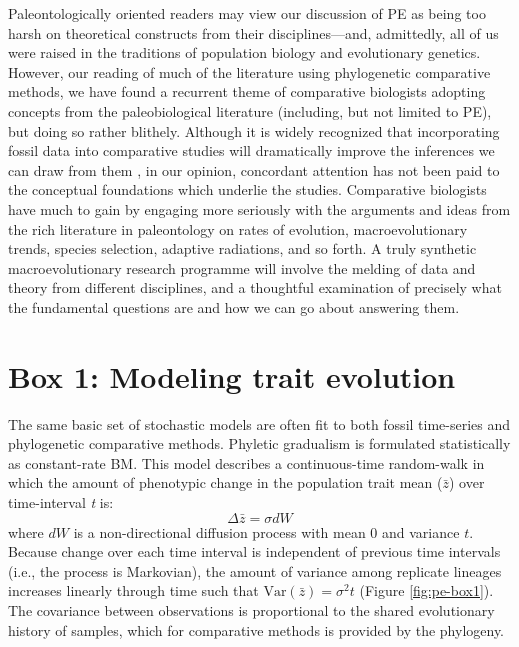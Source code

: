 Paleontologically oriented readers may view our discussion of PE as being too harsh on theoretical constructs from their disciplines---and, admittedly, all of us were raised in the traditions of population biology and evolutionary genetics. However, our reading of much of the literature using phylogenetic comparative methods, we have found a recurrent theme of comparative biologists adopting concepts from the paleobiological literature (including, but not limited to PE), but doing so rather blithely. Although it is widely recognized that incorporating fossil data into comparative studies will dramatically improve the inferences we can draw from them \citep{QuentalMarshall2010, Slater2012Fossil, PennellHarmon, Fritz2013}, in our opinion, concordant attention has not been paid to the conceptual foundations which underlie the studies. Comparative biologists have much to gain by engaging more seriously with the arguments and ideas from the rich literature in paleontology on rates of evolution, macroevolutionary trends, species selection, adaptive radiations, and so forth. A truly synthetic macroevolutionary research programme will involve the melding of data and theory from different disciplines, and a thoughtful examination of precisely what the fundamental questions are and how we can go about answering them.

\section{Box 1: Modeling trait evolution}
The same basic set of stochastic models are often fit to both fossil time-series and phylogenetic comparative methods. Phyletic gradualism is formulated statistically as constant-rate BM. This model describes a continuous-time random-walk in which the amount of phenotypic change in the population trait mean ($\bar{z}$) over time-interval \textit{t} is:
\begin{equation}
\Delta \bar{z} = \sigma dW
\end{equation}
where $dW$ is a non-directional diffusion process with mean 0 and variance $t$. Because change over each time interval is independent of previous time intervals (i.e., the process is Markovian), the amount of variance among replicate lineages increases linearly through time such that  $\text{Var}(\bar{z}) = \sigma^2 t$ (Figure \ref{fig:pe-box1}). The covariance between observations is proportional to the shared evolutionary history of samples, which for comparative methods is provided by the phylogeny. 


